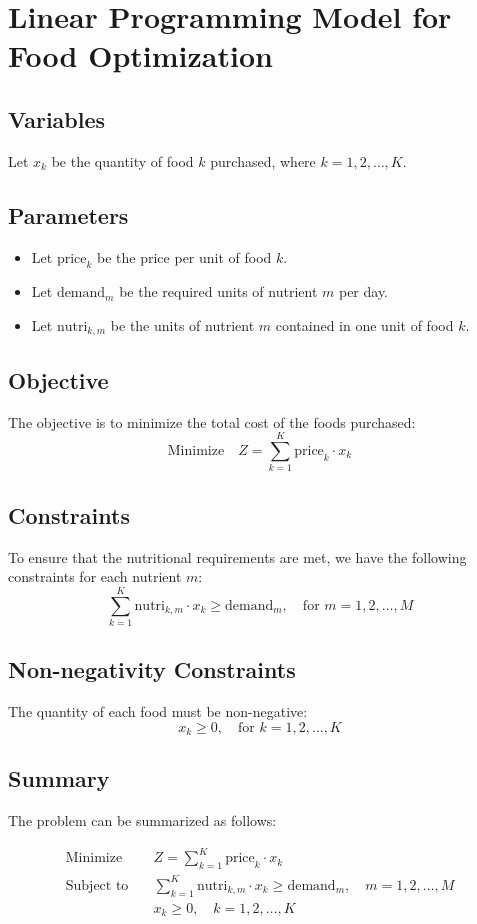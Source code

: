 \documentclass{article}
\begin{document}
\section*{Linear Programming Model for Food Optimization}

\subsection*{Variables}
Let \( x_k \) be the quantity of food \( k \) purchased, where \( k = 1, 2, \ldots, K \).

\subsection*{Parameters}
\begin{itemize}
    \item Let \( \text{price}_k \) be the price per unit of food \( k \).
    \item Let \( \text{demand}_m \) be the required units of nutrient \( m \) per day.
    \item Let \( \text{nutri}_{k,m} \) be the units of nutrient \( m \) contained in one unit of food \( k \).
\end{itemize}

\subsection*{Objective}
The objective is to minimize the total cost of the foods purchased:
\[
\text{Minimize} \quad Z = \sum_{k=1}^{K} \text{price}_k \cdot x_k
\]

\subsection*{Constraints}
To ensure that the nutritional requirements are met, we have the following constraints for each nutrient \( m \):
\[
\sum_{k=1}^{K} \text{nutri}_{k,m} \cdot x_k \geq \text{demand}_m, \quad \text{for } m = 1, 2, \ldots, M
\]

\subsection*{Non-negativity Constraints}
The quantity of each food must be non-negative:
\[
x_k \geq 0, \quad \text{for } k = 1, 2, \ldots, K
\]

\subsection*{Summary}
The problem can be summarized as follows:

\begin{align*}
\text{Minimize} & \quad Z = \sum_{k=1}^{K} \text{price}_k \cdot x_k \\
\text{Subject to} & \quad \sum_{k=1}^{K} \text{nutri}_{k,m} \cdot x_k \geq \text{demand}_m, \quad m = 1, 2, \ldots, M \\
& \quad x_k \geq 0, \quad k = 1, 2, \ldots, K
\end{align*}
\end{document}
